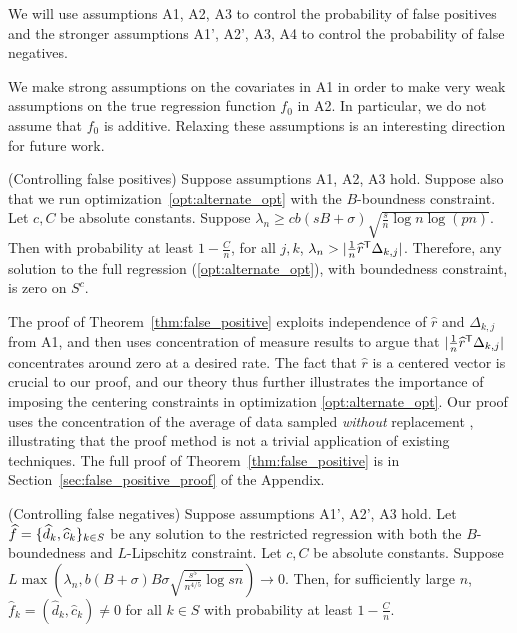 We will use assumptions A1, A2, A3 to control the probability of false positives and the stronger assumptions A1', A2', A3, A4 to control the probability of false negatives.

\begin{remark}
  We make strong assumptions on the covariates in A1 in order to make
  very weak assumptions on the true regression function $f_0$ in
  A2. In particular, we do not assume that $f_0$ is additive. Relaxing
  these assumptions is an interesting direction for future work.
\end{remark}

\begin{theorem} (Controlling false positives) 
\label{thm:false_positive}
Suppose assumptions A1, A2, A3 hold. Suppose also that we run optimization~\eqref{opt:alternate_opt} with the $B$-boundness constraint. Let $c,C$ be absolute constants.
Suppose $\lambda_n \geq c b (sB + \sigma) \sqrt{ \frac{s}{n} \log n
  \log (pn)}$.  Then with probability at least $ 1 - \frac{C}{n}$, for all $j,k$, $\lambda_n >  | \frac{1}{n} \widehat{r}^{\mathsf{T}} \Delta_{k,j}|$.
Therefore, any solution to the full regression (\ref{opt:alternate_opt}), with boundedness constraint, is zero on $S^c$. 
\end{theorem}

The proof of Theorem~\ref{thm:false_positive} exploits independence of
$\hat{r}$ and $\Delta_{k,j}$ from A1, and then uses concentration of
measure results to argue that $| \frac{1}{n} \widehat{r}^{\mathsf{T}}
\Delta_{k,j}|$ concentrates around zero at a desired rate. The fact
that $\hat{r}$ is a centered vector is crucial to our proof, and our
theory thus further illustrates the importance of imposing the
centering constraints in optimization \eqref{opt:alternate_opt}. Our
proof uses the concentration of the average of
data sampled \emph{without} replacement
\cite{serfling1974probability}, illustrating that the proof method is not a
trivial application of existing techniques. The full proof of
Theorem~\ref{thm:false_positive} is in
Section~\ref{sec:false_positive_proof} of the Appendix.

\begin{theorem} (Controlling false negatives)
\label{thm:false_negative}
Suppose assumptions A1', A2', A3 hold. Let $\displaystyle \widehat{f} = \{ \widehat{d}_k, \widehat{c}_k\}_{k\in S}$ be any solution to the restricted regression with both the $B$-boundedness and $L$-Lipschitz constraint. Let $c,C$ be absolute constants.
Suppose $L \max \left(\lambda_n, b (B+\sigma)B\sigma \sqrt{\frac{s^5}{n^{4/5}} \log sn} \right) \rightarrow 0$.
Then, for sufficiently large $n$, $\hat{f}_k = (\hat{d}_k, \hat{c}_k)
\neq 0$ for all $k \in S$ with probability at least $1-\frac{C}{n}$.
\end{theorem}

